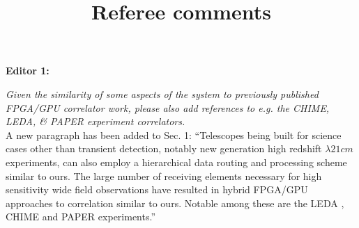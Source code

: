 \documentclass{article}
\begin{document}
\title  {Referee  comments}
\maketitle

\textbf  {Editor  1:}

\textit{Given  the  similarity of  some  aspects  of  the system  to  previously
  published FPGA/GPU  correlator work,  please also add  references to  e.g. the
  CHIME, LEDA, \& PAPER experiment correlators.}\\

A new paragraph has been added to Sec. 1: ``Telescopes being
built for science  cases other than transient detection,  notably new generation
high redshift  $\lambda21cm$ experiments,  can also  employ a  hierarchical data
routing and  processing scheme similar to  ours.  The large number  of receiving
elements necessary for high sensitivity  wide field observations have resulted in
hybrid FPGA/GPU approaches to correlation  similar to ours.  Notable among these
are  the  LEDA  \citep{kocz2015digital}, CHIME  \citep{bandura2014canadian}  and
PAPER \citep{parsons2010precision} experiments.''\\
\end{document}
